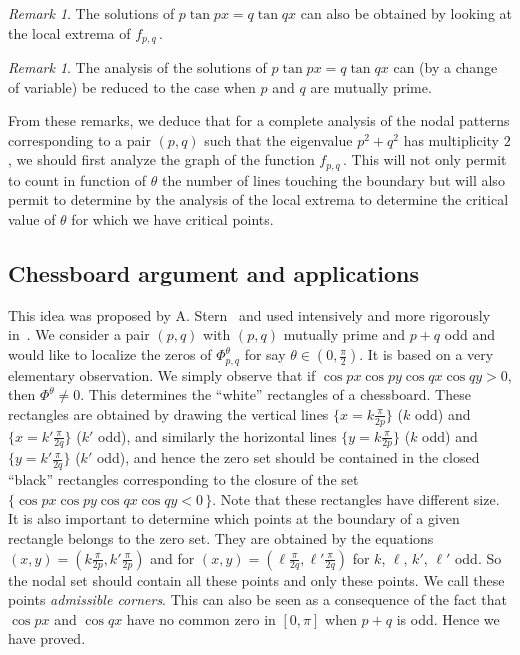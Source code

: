 \documentclass[a4paper,reqno,11pt]{amsart}
\theoremstyle{remark}
\newtheorem{remark}[thm]{Remark}
\theoremstyle{definition}
\numberwithin{equation}{section}
\begin{document}
\begin{remark}\label{rmcrtbnd}
The solutions of $p \tan px =q \tan qx$ can also be obtained by looking 
at the local extrema of  $f_{p,q}\,$.
\end{remark}

\begin{remark}\label{lmutuallyprime}
The analysis of the solutions of  $p \tan px =q \tan qx$ can (by a change of 
variable) be reduced to the case when $p$ and $q$ are mutually prime.
\end{remark}

From these remarks, we deduce that for a complete analysis of the nodal patterns 
corresponding to a pair $(p,q)$ such that the eigenvalue  $p^2 + q^2$ has multiplicity $2$, we 
should first analyze the graph of the function $f_{p,q}\,$. 
This will not only permit to count in function of $\theta$ the number of lines 
touching the boundary but will also permit to determine by the analysis of the 
local extrema to determine the critical value of $\theta$ for which we have 
critical points. 

\subsection{Chessboard argument and applications}\mbox{}
This idea was proposed by A. Stern~\cite{St} and used intensively 
and more rigorously in~\cite{BH,BHSphere,BH2}.
We consider a pair $(p,q)$ with $(p,q)$ mutually prime and $p+q$ odd and  
would like to localize the zeros of $\Phi_{p,q}^\theta$ for say 
$\theta \in (0,\frac \pi 2)$. It is based on a very elementary observation. 
We simply observe that if $\cos p x \cos p y \cos qx \cos qy >0$, then 
$\Phi^\theta \neq 0$. This determines the 
``white'' rectangles of a chessboard.  These rectangles are obtained by 
drawing the vertical lines $\{x= k \frac{\pi}{2p}\}$ ($k$ odd)
and  $\{x= k' \frac{\pi}{2q}\}$ ($k'$ odd), and similarly the 
horizontal lines $\{y= k \frac{\pi}{2p}\}$ ($k$ odd) and  
$\{y= k' \frac{\pi}{2q}\}$ ($k'$ odd), and hence the zero set should 
be contained in the closed ``black'' rectangles corresponding to the closure 
of the set  $\{\cos p x \cos p y \cos qx \cos qy <0\,\}$.  Note that 
these rectangles have different size. It is also important to determine 
which points at the boundary of a given rectangle belongs to the zero set. 
They are obtained  by the equations 
$(x,y)=(k \frac {\pi} {2p}, k'\frac {\pi} {2p})$ and for 
$(x,y)= (\ell \frac {\pi} {2q}, \ell' \frac{ \pi}{ 2q})$ for 
$k$, $\ell$, $k'$, $\ell'$ odd. So the nodal set should contain all these 
points and only these points.  We call these points \emph{admissible corners}. 
This can also be seen as a consequence of the fact that $\cos p x$ and $\cos qx $ 
have no common zero in $[0,\pi]$ when $p+q$ is odd. Hence we have proved.
\end{document}
